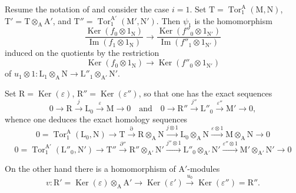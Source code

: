 \begin{env}[11.2.3]
\label{IV.11.2.3}
Resume the notation of  and consider the case $i=1$.
Set
$\mathrm{T}=\operatorname{Tor}_1^\mathrm{A}(\mathrm{M},\mathrm{N})$,
$\mathrm{T}'=\mathrm{T}\otimes_\mathrm{A}\mathrm{A}'$, and
$\mathrm{T}''=\operatorname{Tor}_1^{\mathrm{A}'}
(\mathrm{M}',\mathrm{N}')$. Then $\psi_1$ is the homomorphism
\[
  \frac{\operatorname{Ker}(f_0\otimes1_\mathrm{N})}
       {\operatorname{Im}(f_1\otimes1_\mathrm{N})}
  \longrightarrow
  \frac{\operatorname{Ker}(f''_0\otimes1_{\mathrm{N}'})}
       {\operatorname{Im}(f''_1\otimes1_{\mathrm{N}'})}
\]
induced on the quotients by the restriction
\[
  \operatorname{Ker}(f_0\otimes1_\mathrm{N})
  \longrightarrow
  \operatorname{Ker}(f''_0\otimes1_{\mathrm{N}'})
\]
of
$u_1\otimes1:\mathrm{L}_1\otimes_\mathrm{A}\mathrm{N}\to
\mathrm{L}''_1\otimes_{\mathrm{A}'}\mathrm{N}'$.

Set $\mathrm{R}=\operatorname{Ker}(\varepsilon)$, $\mathrm{R}''=\operatorname{Ker}(\varepsilon'')$, so that one has the exact sequences
\begin{equation}
  0\longrightarrow\mathrm{R}\xrightarrow{j}\mathrm{L}_0\xrightarrow{\varepsilon}\mathrm{M}\longrightarrow 0
  \quad\text{and}\quad
  0\longrightarrow\mathrm{R}''\xrightarrow{j''}\mathrm{L}''_0\xrightarrow{\varepsilon''}\mathrm{M}'\longrightarrow 0,
\end{equation}
whence one deduces the exact homology sequences
\begin{equation}
  0=\operatorname{Tor}_1^\mathrm{A}(\mathrm{L}_0,\mathrm{N})\to\mathrm{T}\xrightarrow{\partial}\mathrm{R}\otimes_\mathrm{A}\mathrm{N}\xrightarrow{j\otimes 1}\mathrm{L}_0\otimes_\mathrm{A}\mathrm{N}\xrightarrow{\varepsilon\otimes 1}\mathrm{M}\otimes_\mathrm{A}\mathrm{N}\to 0
  \label{IV.11.2.3.1}
\tag{11.2.3.1}
\end{equation}
\begin{equation}
  0=\operatorname{Tor}_1^{\mathrm{A}'}(\mathrm{L}''_0,\mathrm{N}')\to\mathrm{T}''\xrightarrow{\partial''}\mathrm{R}''\otimes_{\mathrm{A}'}\mathrm{N}'\xrightarrow{j''\otimes 1}\mathrm{L}''_0\otimes_{\mathrm{A}'}\mathrm{N}'\xrightarrow{\varepsilon''\otimes 1}\mathrm{M}'\otimes_{\mathrm{A}'}\mathrm{N}'\to 0
  \label{IV.11.2.3.2}
\tag{11.2.3.2}
\end{equation}

On the other hand there is a homomorphism of $\mathrm{A}'$-modules
\[
  v:\mathrm{R}'=\operatorname{Ker}(\varepsilon)\otimes_\mathrm{A}\mathrm{A}'\longrightarrow\operatorname{Ker}(\varepsilon')\xrightarrow{u_0}\operatorname{Ker}(\varepsilon'')=\mathrm{R}''.
\]
\end{env}

